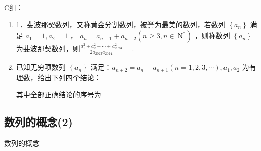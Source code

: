 C组：
\begin{enumerate}
    \item 1．斐波那契数列，又称黄金分割数列，被誉为最美的数列，若数列 $\left\{a_n\right\}$ 满足 $a_1=1, a_2=1$ ， $a_n=a_{n-1}+a_{n-2}\left(n \geq 3, n \in \mathrm{~N}^*\right)$ ，则称数列 $\left\{a_n\right\}$ 为斐波那契数列，则$\frac{a_1^2+a_2^2+\cdots+a_{2023}^2}{2 a_{2023} a_{2024}}=$.

\item 已知无穷项数列 $\left\{a_n\right\}$ 满足：$a_{n+2}=a_n+a_{n+1}(n=1,2,3, \cdots), a_1, a_2$ 为有理数，给出下列四个结论：
其中全部正确结论的序号为
    
\end{enumerate}


\subsection*{数列的概念(2)}
\zsd 数列的概念

